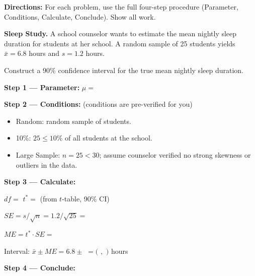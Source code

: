 \documentclass[10pt]{article}
\begin{document}
\namepartnerperiod

\vspace{0.1in}
\textbf{Directions:} For each problem, use the full four-step procedure (Parameter,
Conditions, Calculate, Conclude). Show all work.

\begin{tcolorbox}[colback=white, colframe=black!40, title=\textbf{Tier R --- Remediate},
    fonttitle=\bfseries, arc=2mm, left=3mm, right=3mm, top=2mm, bottom=2mm]

\textbf{Sleep Study.} A school counselor wants to estimate the mean nightly sleep
duration for students at her school. A random sample of 25 students yields
$\bar x = 6.8$ hours and $s = 1.2$ hours.

Construct a 90\% confidence interval for the true mean nightly sleep duration.

\textbf{Step 1 --- Parameter:} $\mu = $ 

\textbf{Step 2 --- Conditions:} (conditions are pre-verified for you)
\begin{itemize}
    \item Random: random sample of students. \checkmark
    \item 10\%: $25 \le 10\%$ of all students at the school. \checkmark
    \item Large Sample: $n = 25 < 30$; assume counselor verified no strong skewness or
          outliers in the data. \checkmark
\end{itemize}

\textbf{Step 3 --- Calculate:}

$df = $  \quad $t^* = $  (from $t$-table, 90\% CI)

$SE = s/\sqrt{n} = 1.2/\sqrt{25} = $ 

$ME = t^* \cdot SE = $ 

Interval: $\bar x \pm ME = 6.8 \pm $  $= ($  $,$  $)$ hours

\textbf{Step 4 --- Conclude:} \\

\end{tcolorbox}
\end{document}
